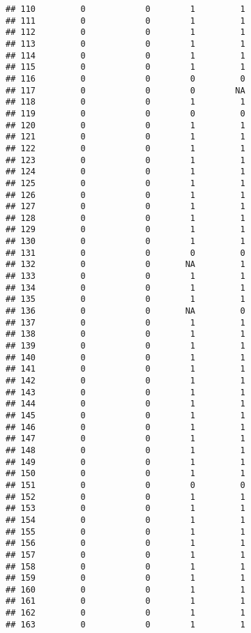 \documentclass[
]{article}
\begin{document}
\begin{verbatim}
## 110         0            0        1         1
## 111         0            0        1         1
## 112         0            0        1         1
## 113         0            0        1         1
## 114         0            0        1         1
## 115         0            0        1         1
## 116         0            0        0         0
## 117         0            0        0        NA
## 118         0            0        1         1
## 119         0            0        0         0
## 120         0            0        1         1
## 121         0            0        1         1
## 122         0            0        1         1
## 123         0            0        1         1
## 124         0            0        1         1
## 125         0            0        1         1
## 126         0            0        1         1
## 127         0            0        1         1
## 128         0            0        1         1
## 129         0            0        1         1
## 130         0            0        1         1
## 131         0            0        0         0
## 132         0            0       NA         1
## 133         0            0        1         1
## 134         0            0        1         1
## 135         0            0        1         1
## 136         0            0       NA         0
## 137         0            0        1         1
## 138         0            0        1         1
## 139         0            0        1         1
## 140         0            0        1         1
## 141         0            0        1         1
## 142         0            0        1         1
## 143         0            0        1         1
## 144         0            0        1         1
## 145         0            0        1         1
## 146         0            0        1         1
## 147         0            0        1         1
## 148         0            0        1         1
## 149         0            0        1         1
## 150         0            0        1         1
## 151         0            0        0         0
## 152         0            0        1         1
## 153         0            0        1         1
## 154         0            0        1         1
## 155         0            0        1         1
## 156         0            0        1         1
## 157         0            0        1         1
## 158         0            0        1         1
## 159         0            0        1         1
## 160         0            0        1         1
## 161         0            0        1         1
## 162         0            0        1         1
## 163         0            0        1         1

\end{verbatim}
\end{document}
